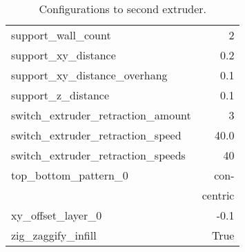 \begin{multicols}{2}
\begin{table}[H]
\begin{tabular}{|l|r|}
            support\_wall\_count                  & 2              \\
            support\_xy\_distance                 & 0.2            \\
            support\_xy\_distance\_overhang       & 0.1            \\
            support\_z\_distance                  & 0.1            \\
            switch\_extruder\_retraction\_amount  & 3              \\
            switch\_extruder\_retraction\_speed   & 40.0           \\
            switch\_extruder\_retraction\_speeds  & 40             \\
            top\_bottom\_pattern\_0               & con-           \\
                                                  & centric        \\
            xy\_offset\_layer\_0                  & -0.1           \\
            zig\_zaggify\_infill                  & True           \\
            \hline
        \end{tabular}
        \caption{Configurations to second extruder.}
    \end{table}
\end{multicols}